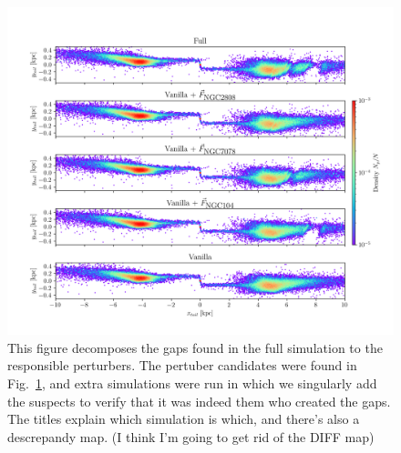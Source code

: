 \documentclass[]{aa}
\begin{document}
  \begin{figure}
    \centering
    \includegraphics[width=\linewidth]{decomposition-monte-carlo-009-with-3-gaps.png}
    \caption[]{This figure decomposes the gaps found in the full simulation to the responsible perturbers. The pertuber candidates were found in Fig.~\ref{fig:profiles}, and extra simulations were run in which we singularly add the suspects to verify that it was indeed them who created the gaps. The titles explain which simulation is which, and there's also a descrepandy map. (I think I'm going to get rid of the DIFF map)}
    \label{fig:profiles}
    \end{figure}  


  
\end{document}
